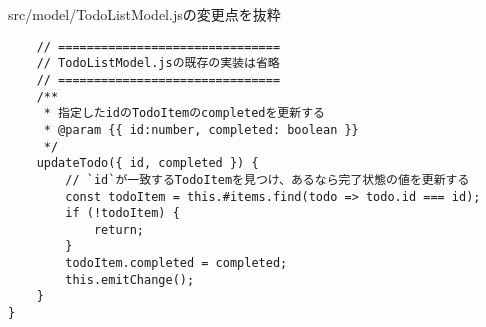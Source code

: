 \begin{listtitle}
src/model/TodoListModel.jsの変更点を抜粋
\end{listtitle}
\begin{lstlisting}
    // ===============================
    // TodoListModel.jsの既存の実装は省略
    // ===============================
    /**
     * 指定したidのTodoItemのcompletedを更新する
     * @param {{ id:number, completed: boolean }}
     */
    updateTodo({ id, completed }) {
        // `id`が一致するTodoItemを見つけ、あるなら完了状態の値を更新する
        const todoItem = this.#items.find(todo => todo.id === id);
        if (!todoItem) {
            return;
        }
        todoItem.completed = completed;
        this.emitChange();
    }
}
\end{lstlisting}
\listend

